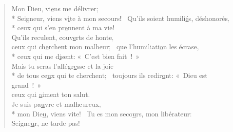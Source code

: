 
\begin{verse}
Mon Dieu, vi\underline{e}ns me délivrer; \\*
Seigneur, viens v\underline{i}te à mon secours!~\psalmstar
{}Qu’ils soient humili\underline{é}s, déshonorés, \\*
ceux qui s’en pr\underline{e}nnent à ma vie! \\

Qu’ils reculent, couv\underline{e}rts de honte, \\
ceux qui ch\underline{e}rchent mon malheur;~\psalmstar
{}que l’humiliati\underline{o}n les écrase, \\*
ceux qui me d\underline{i}sent: « C’est bien fait ! » \\

Mais tu seras l’allégr\underline{e}sse et la joie \\*
de tous ce\underline{u}x qui te cherchent;~\psalmstar
toujours ils redir\underline{o}nt: « Dieu est grand ! » \\
ceux qui \underline{a}iment ton salut. \\

Je suis pa\underline{u}vre et malheureux, \\*
mon Die\underline{u}, viens vite!~\psalmstar
Tu es mon seco\underline{u}rs, mon libérateur: \\
Seigne\underline{u}r, ne tarde pas! \\
\end{verse}

